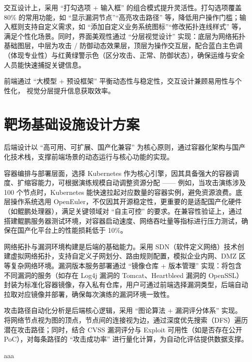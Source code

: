 \documentclass[lang=cn,10pt]{elegantbook}
\begin{document}
交互设计上，采用 “打勾选项 + 输入框” 的组合模式提升灵活性。打勾选项覆盖 80\% 的常用功能，如 “显示漏洞节点”“高亮攻击路径” 等，降低用户操作门槛；输入框则支持自定义需求，如 “添加自定义业务系统图标”“修改拓扑连线样式” 等，满足个性化场景。同时，界面美观性通过 “分层视觉设计” 实现：底层为网络拓扑基础图层，中层为攻击 / 防御动态效果层，顶层为操作交互层，配合蓝白主色调（体现专业性）与红黄绿警示色（区分攻击、正常、防御状态），确保运维与安全人员能快速捕捉关键信息。

\begin{definition}
    前端通过 “大模型 + 预设框架” 平衡动态性与稳定性，交互设计兼顾易用性与个性化，
    视觉分层提升信息获取效率。
\end{definition}

\section{靶场基础设施设计方案}


后端设计以 “高可用、可扩展、国产化兼容” 为核心原则，通过容器化架构与国产化技术栈，支撑前端场景的动态运行与核心功能的实现。​

容器编排与部署层面，选择 Kubernetes 作为核心引擎，因其具备强大的容器调度、扩缩容能力，可根据演练规模自动调整资源分配 —— 例如，当攻击演练涉及 100 个节点时，Kubernetes 能快速拉起对应数量的容器实例，避免资源浪费。底层操作系统选用 OpenEuler，不仅因其开源稳定性，更重要的是适配国产化硬件（如鲲鹏处理器），满足关键领域对 “自主可控” 的要求。在兼容性验证上，通过搭建鲲鹏服务器测试环境，对容器启动速度、网络吞吐量等指标进行压力测试，确保在国产化平台上的性能损耗低于 10\%。​

网络拓扑与漏洞环境构建是后端的基础能力。采用 SDN（软件定义网络）技术创建虚拟网络拓扑，支持自定义子网划分、路由规则配置，模拟企业内网、DMZ 区等复杂网络环境。漏洞版本服务部署通过 “镜像仓库 + 版本管理” 实现：将包含不同漏洞的服务（如存在 Log4j 漏洞的 Tomcat、Heartbleed 漏洞的 OpenSSL）封装为标准化容器镜像，存入私有仓库，用户可通过前端选择漏洞类型，后端自动拉取对应镜像并部署，确保每次演练的漏洞环境一致性。​

攻击路径自动化分析是后端核心逻辑，采用 “图论算法 + 漏洞评分体系” 实现。将网络节点视为图的顶点，节点间的连接视为边，通过深度优先搜索（DFS）遍历潜在攻击路径；同时，结合 CVSS 漏洞评分与 Exploit 可用性（如是否存在公开 PoC），对每条路径的 “攻击成功率” 进行量化计算，为自动化评估提供数据支撑。

\begin{definition}
    aaa
\end{definition}
\end{document}
